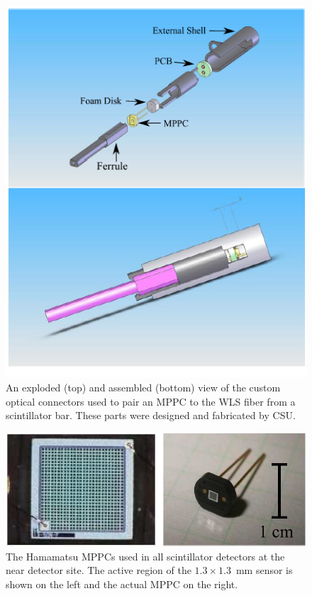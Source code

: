 \begin{figure}
\begin{center}
\includegraphics[width=5in]{./Figures/mppc2.png}
\end{center}
\caption{An exploded (top) and assembled (bottom) view of the custom
  optical connectors used to pair an MPPC to the WLS fiber from a
  scintillator bar. These parts were designed and fabricated by CSU.}
\label{fig:mppc2}
\end{figure}


\begin{figure}
\begin{center}
\includegraphics[width=5in]{./Figures/mppc1.png}
\end{center}
\caption{The Hamamatsu MPPCs used in all scintillator detectors at
  the near detector site. The active region of the $1.3\times 1.3$~mm sensor is shown on the left and
  the actual MPPC on the right.}
\label{fig:mppc1}
\end{figure}

